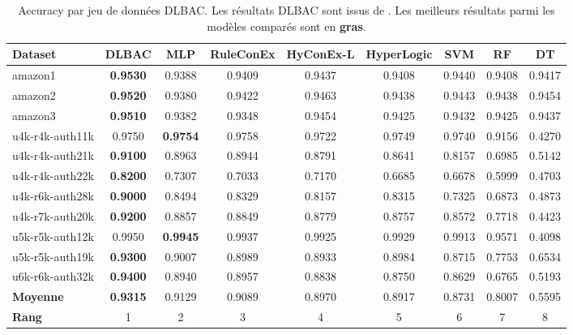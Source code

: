 \documentclass[12pt,a4paper]{article}
\begin{document}
\begin{table}[htbp]
  \centering
  \caption{Accuracy par jeu de données DLBAC. Les résultats DLBAC sont issus
           de \citet{nobi2022dlbac}. Les meilleurs résultats parmi les modèles
           comparés sont en \textbf{gras}.}
  \label{tab:accuracy_full}
  \small
  \setlength{\tabcolsep}{4pt}
  \begin{tabular}{lcccccccc}
    \toprule
    \textbf{Dataset} & \textbf{DLBAC} & \textbf{MLP} & \textbf{RuleConEx}
      & \textbf{HyConEx-L} & \textbf{HyperLogic} & \textbf{SVM}
      & \textbf{RF} & \textbf{DT} \\
    \midrule
    amazon1          & \textbf{0.9530} & 0.9388 & 0.9409 & 0.9437 & 0.9408 & 0.9440 & 0.9408 & 0.9417 \\
    amazon2          & \textbf{0.9520} & 0.9380 & 0.9422 & 0.9463 & 0.9438 & 0.9443 & 0.9438 & 0.9454 \\
    amazon3          & \textbf{0.9510} & 0.9382 & 0.9348 & 0.9454 & 0.9425 & 0.9432 & 0.9425 & 0.9437 \\
    u4k-r4k-auth11k  & 0.9750 & \textbf{0.9754} & 0.9758 & 0.9722 & 0.9749 & 0.9740 & 0.9156 & 0.4270 \\
    u4k-r4k-auth21k  & \textbf{0.9100} & 0.8963 & 0.8944 & 0.8791 & 0.8641 & 0.8157 & 0.6985 & 0.5142 \\
    u4k-r4k-auth22k  & \textbf{0.8200} & 0.7307 & 0.7033 & 0.7170 & 0.6685 & 0.6678 & 0.5999 & 0.4703 \\
    u4k-r6k-auth28k  & \textbf{0.9000} & 0.8494 & 0.8329 & 0.8157 & 0.8315 & 0.7325 & 0.6873 & 0.4873 \\
    u4k-r7k-auth20k  & \textbf{0.9200} & 0.8857 & 0.8849 & 0.8779 & 0.8757 & 0.8572 & 0.7718 & 0.4423 \\
    u5k-r5k-auth12k  & 0.9950 & \textbf{0.9945} & 0.9937 & 0.9925 & 0.9929 & 0.9913 & 0.9571 & 0.4098 \\
    u5k-r5k-auth19k  & \textbf{0.9300} & 0.9007 & 0.8989 & 0.8933 & 0.8984 & 0.8715 & 0.7753 & 0.6534 \\
    u6k-r6k-auth32k  & \textbf{0.9400} & 0.8940 & 0.8957 & 0.8838 & 0.8750 & 0.8629 & 0.6765 & 0.5193 \\
    \midrule
    \textbf{Moyenne} & \textbf{0.9315} & 0.9129 & 0.9089 & 0.8970 & 0.8917 & 0.8731 & 0.8007 & 0.5595 \\
    \textbf{Rang}    & 1 & 2 & 3 & 4 & 5 & 6 & 7 & 8 \\
    \bottomrule
  \end{tabular}
\end{table}
\end{document}
